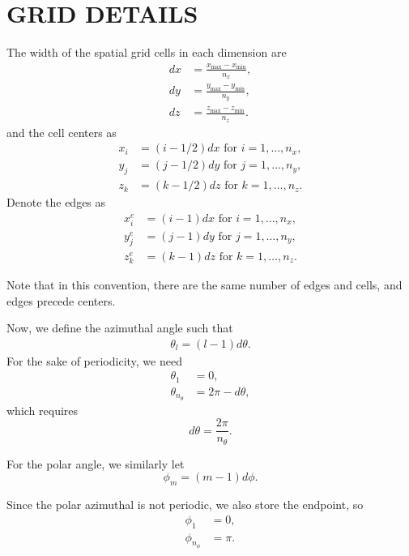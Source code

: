 \chapter{GRID DETAILS}
\label{chap:grid_details}

The width of the spatial grid cells in each dimension are
\begin{align*}
  dx &= \frac{x_{\max}-x_{\min}}{n_x}, \\
  dy &= \frac{y_{\max}-y_{\min}}{n_y}, \\
  dz &= \frac{z_{\max}-z_{\min}}{n_z}.
\end{align*}
and the cell centers as
\begin{align*}
  x_i &= (i-1/2)dx \mbox{ for } i=1,\ldots,n_x, \\
  y_j &= (j-1/2)dy \mbox{ for } j=1,\ldots,n_y, \\
  z_k &= (k-1/2)dz \mbox{ for } k=1,\ldots,n_z.
\end{align*}
Denote the edges as
\begin{align*}
  x_i^e &= (i-1)dx \mbox{ for } i=1,\ldots,n_x, \\
  y_j^e &= (j-1)dy \mbox{ for } j=1,\ldots,n_y, \\
  z_k^e &= (k-1)dz \mbox{ for } k=1,\ldots,n_z.
\end{align*}

Note that in this convention, there are the same number of edges and cells,
and edges precede centers.

Now, we define the azimuthal angle such that
\begin{align*}
  \theta_l = (l-1)d\theta.
\end{align*}
For the sake of periodicity, we need
\begin{align*}
  \theta_1 &= 0, \\
  \theta_{n_\theta} &= 2\pi-d\theta,
\end{align*}
which requires
\begin{equation*}
  d\theta = \frac{2\pi}{n_\theta}.
\end{equation*}

For the polar angle, we similarly let
\begin{equation*}
  \phi_m = (m-1)d\phi.
\end{equation*}

Since the polar azimuthal is not periodic, we also store the endpoint, so
\begin{align*}
  \phi_1 &= 0, \\
  \phi_{n_\phi} &= \pi.
\end{align*}

